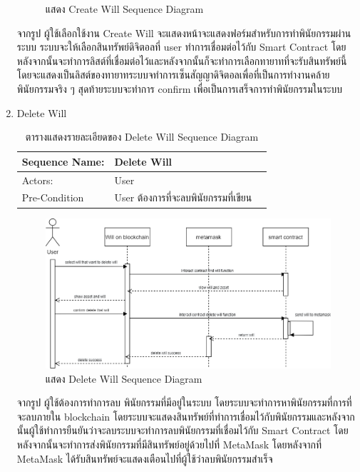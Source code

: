 \documentclass[12pt,oneside,openright,a4paper]{cpe-thai-project}
\begin{document}
\begin{enumerate}[label=\thesubsection.\arabic*,leftmargin=0pt,itemindent=1.25cm]
\begin{figure}[!thb]
			\caption{แสดง Create Will Sequence Diagram}
		\end{figure}
		\FloatBarrier
	\tab จากรูป ผู้ใช้เลือกใช้งาน Create Will จะแสดงหน้าจะแสดงฟอร์มสำหรับการทำพินัยกรรมผ่านระบบ ระบบจะให้เลือกสินทรัพย์ดิจิตอลที่ user ทำการเชื่อมต่อไว้กับ Smart Contract โดยหลังจากนั้นจะทำการลิสต์ที่เชื่อมต่อไว้และหลังจากนั้นก็จะทำการเลือกทายาทที่จะรับสินทรัพย์นี้ โดยจะแสดงเป็นลิสต์ของทายาทระบบจทำการเซ็นสัญญาดิจิตอลเพื่อที่เป็นการทำงานคล้ายพินัยกรรมจริง ๆ สุดท้ายระบบจะทำการ confirm เพื่อเป็นการเสร็จการทำพินัยกรรมในระบบ
\clearpage
	\item Delete Will
	\begin{table}[h]
		\centering
		\caption{ตารางแสดงรายละเอียดของ Delete Will Sequence Diagram}
		\begin{tabularx}{\textwidth}{|l|X|X|} 
			\hline
			Sequence Name: & Delete Will                           \\ 
			\hline
			Actors:        & User                                  \\ 
			\hline
			Pre-Condition  & User ต้องการที่จะลบพินัยกรรมที่เขียน  \\
			\hline
		\end{tabularx}
	\end{table}
		\begin{figure}[!thb]
			\centering
			\includegraphics[scale=0.5]{deleteWillseq}
			\caption{แสดง Delete Will Sequence Diagram}
		\end{figure}
		\FloatBarrier
	\tab จากรูป ผู้ใช้ต้องการทำการลบ พินัยกรรมที่มีอยู่ในระบบ โดยระบบจะทำการหาพินัยกรรมที่การที่จะลบภายใน blockchain โดยระบบจะแสดงสินทรัพย์ที่ทำการเชื่อมไว้กับพินัยกรรมและหลังจากนั้นผู้ใช้ทำการยืนยันว่าจะลบระบบจะทำการลบพินัยกรรมที่เชื่อมไว้กับ Smart Contract โดยหลังจากนั้นจะทำการส่งพินัยกรรมที่มีสินทรัพย์อยู่ด้วยไปที่ MetaMask โดยหลังจากที่ MetaMask ได้รับสินทรัพย์จะแสดงเตือนไปที่ผู้ใช้ว่าลบพินัยกรรมสำเร็จ

\end{enumerate}
\end{document}
